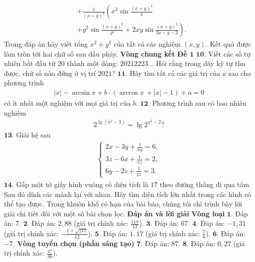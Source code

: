 \begin{multicols}{2}
\begin{align*}
		&+ \frac{1}{{{{(x + y)}^2}}}\left( {x^2}\sin \frac{{{{(x + y)}^2}}}{x}\right. \\
		&\left.+ {y^2}\sin \frac{{{{(x + y)}^2}}}{{{y^2}}} + 2xy\sin \frac{{{{(x + y)}^2}}}{{3x - y - 2}} \right).
	\end{align*}
	Trong đáp án hãy viết tổng $x^2 + y^2$ của tất cả các nghiệm  $(x,y)$. Kết quả được làm tròn tới hai chữ số sau dấu phảy. 
	\vskip 0.1cm
	\textbf{\color{cackithi}Vòng chung kết}
	\vskip 0.1cm
	\textbf{\color{cackithi}Đề $\pmb{1}$}
	\vskip 0.1cm
	$\pmb{10.}$ Viết các số tự nhiên bắt đầu từ $20$ thành một dòng: $20212223\ldots$ Hỏi rằng trong dãy kỹ tự thu được, chữ số nào đứng ở vị trí $2021$?
	\vskip 0.1cm
	$\pmb{11.}$ Hãy tìm tất cả các giá trị của $a$ sao cho phương trình
	\begin{align*}
		|x| \!-\! \arcsin x \!+\! b \!\cdot\! (\arccos x\, \!+\! |x| \!-\! 1) \!+\! a \!=\! 0
	\end{align*}
	có ít nhât một nghiệm với mọi giá trị của $b$.
	\vskip 0.1cm
	$\pmb{12.}$ Phương trình sau có bao nhiêu nghiệm
	\begin{align*}
		{2^{\lg ({x^2} - 3)}} = \lg {2^{{x^2} - 2}}?
	\end{align*}
	$\pmb{13.}$ Giải hệ sau
	\begin{align*}
		\begin{cases}
			2x - 3y + \frac{1}{xy} = 6,\\
			3z - 6x + \frac{1}{xz} = 2,\\
			6y - 2z + \frac{1}{yz} = 3.
		\end{cases}
	\end{align*}
	$\pmb{14.}$ Gấp một tờ giấy hình vuông có diện tích là $17$ theo đường thẳng đi qua tâm. Sau đó dính các mảnh lại với nhau. Hãy tìm diện tích lớn nhất trong các hình có thể tạo được.
	\vskip 0.1cm
	Trong khuôn khổ có hạn của bài báo, chúng tôi chỉ trình bày lời giải chi tiết đối với một số bài chọn lọc.  
	\vskip 0.1cm 
	\textbf{\color{cackithi}Đáp án và lời giải}
	\vskip 0.1cm
	\textbf{\color{cackithi}Vòng loại}
	\vskip 0.1cm
	$\pmb{1.}$ Đáp án: $7$.
	\vskip 0.1cm
	$\pmb{2.}$ Đáp án: $2{,}88$ (giá trị chính xác: $\frac{11\pi}{12}$).
	\vskip 0.1cm
	$\pmb{3.}$ Đáp án: $67$.
	\vskip 0.1cm
	$\pmb{4.}$ Đáp án: $-1{,}31$ (giá trị chính xác:  $-\frac{1+ \sqrt{217}}{12}$).
	\vskip 0.1cm
	$\pmb{5.}$ Đáp án: $1{,}17$ (giá trị chính xác:  $\frac{7}{6}$).
	\vskip 0.1cm
	$\pmb{6.}$ Đáp án:  $-7$.
	\vskip 0.1cm
	\textbf{\color{cackithi}Vòng tuyển chọn (phần sáng tạo)}
	\vskip 0.1cm
	$\pmb{7.}$ Đáp án: $87$.
	\vskip 0.1cm
	$\pmb{8.}$ Đáp án: $0{,}27$ (giá trị chính xác: $\frac{\pi^2}{36}$).

\end{multicols}
